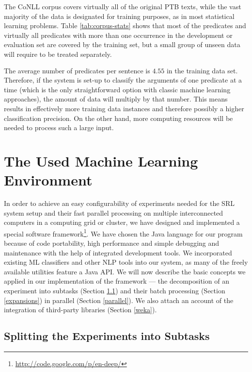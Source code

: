 \documentclass[12pt,notitlepage]{report}
\begin{document}
The CoNLL corpus covers virtually all of the original PTB texts, while the vast majority of the data is designated for training purposes, as in most statistical learning problems. Table \ref{tab:corpus-stats} shows that most of the predicates and virtually all predicates with more than one occurrence in the development or evaluation set are covered by the training set, but a small group of unseen data will require to be treated separately. 

The average number of predicates per sentence is $4.55$ in the training data set. Therefore, if the system is set-up to classify the arguments of one predicate at a time (which is the only straightforward option with classic machine learning approaches), the amount of data will multiply by that number. This means results in effectively more training data instances and therefore possibly a higher classification precision. On the other hand, more computing resources will be needed to process such a large input.

%
%
\chapter{The Used Machine Learning Environment}\label{mlprocess}
%
%

In order to achieve an easy configurability of experiments needed for the SRL system setup and their fast parallel processing on multiple interconnected computers in a computing grid or cluster, we have designed and implemented a special software framework\footnote{\url{http://code.google.com/p/en-deep/}}. We have chosen the Java language for our program because of code portability, high performance and simple debugging and maintenance with the help of integrated development tools. We incorporated existing ML classifiers and other NLP tools into our system, as many of the freely available utilities feature a Java API. We will now describe the basic concepts we applied in our implementation of the framework --- the decomposition of an experiment into subtasks (Section \ref{tasks}) and their batch processing (Section \ref{expansions}) in parallel (Section \ref{parallel}). We also attach an account of the integration of third-party libraries (Section \ref{weka}).

\section{Splitting the Experiments into Subtasks}\label{tasks}
\end{document}
